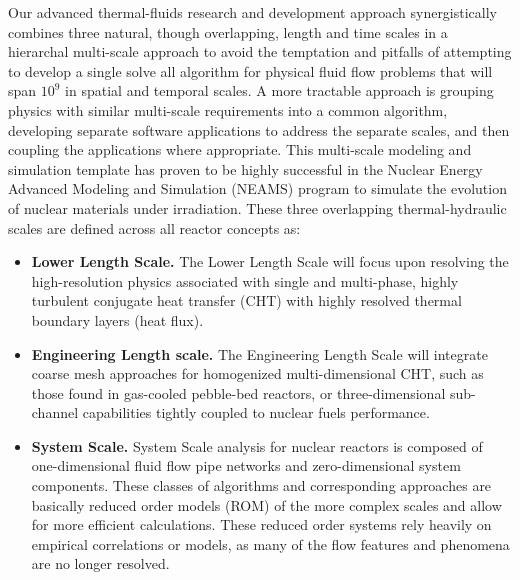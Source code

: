 Our advanced thermal-fluids research and development approach synergistically combines three natural,
though overlapping, length and time scales in a hierarchal multi-scale approach to avoid the temptation and
pitfalls of attempting to develop a single solve all algorithm for physical fluid flow problems that will span $10^{9}$ in spatial and temporal scales. A more tractable approach is grouping physics with similar multi-scale requirements into a common algorithm, developing separate software applications to address the separate scales, and then coupling the applications where appropriate. This multi-scale modeling and simulation template has proven to be highly successful in the Nuclear Energy Advanced Modeling and Simulation (NEAMS) program to simulate the evolution of nuclear materials under irradiation. These three overlapping thermal-hydraulic scales are defined across all reactor concepts as:
\begin{itemize}
    \item \textbf{Lower Length Scale.} The Lower Length Scale will focus upon resolving the high-resolution physics
    associated with single and multi-phase, highly turbulent conjugate heat transfer (CHT) with highly
    resolved thermal boundary layers (heat flux).
    \item \textbf{Engineering Length scale.} The Engineering Length Scale will integrate coarse mesh approaches
    for homogenized multi-dimensional CHT, such as those found in gas-cooled pebble-bed reactors, or three-dimensional sub-channel capabilities tightly coupled to nuclear fuels performance.
    \item \textbf{System Scale.} System Scale analysis for nuclear reactors is composed of one-dimensional fluid flow
    pipe networks and zero-dimensional system components. These classes of algorithms and corresponding approaches are basically reduced order models (ROM) of the more complex scales and allow for more efficient calculations. These reduced order systems rely heavily on empirical correlations or models, as many of the flow features and phenomena are no longer resolved.
\end{itemize}


